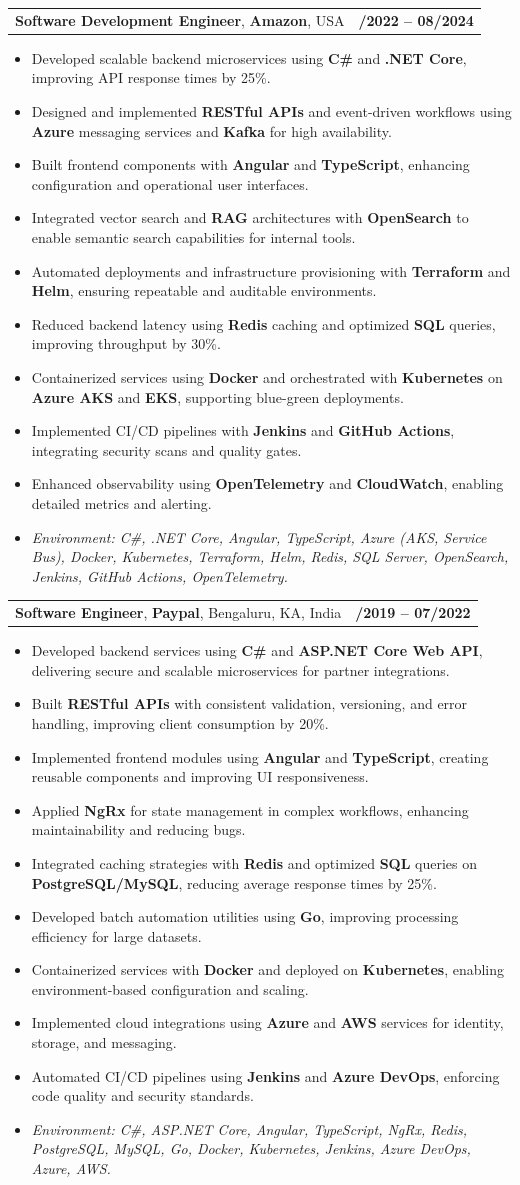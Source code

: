 \documentclass[letterpaper,11pt]{article}
\makeatletter
\newcommand{\resumeItem}[1]{
  \item\footnotesize{
    {#1 \vspace{-2pt}}
  }
}
\newcommand{\resumeSubheading}[4]{
  \vspace{-2pt}\item
    \begin{tabular*}{1.0\textwidth}[t]{l@{\extracolsep{\fill}}r}
      \textbf{\fontsize{10pt}{14pt}\selectfont #3}, \textbf{\fontsize{10pt}{14pt}\selectfont #1}, \fontsize{10pt}{14pt}\selectfont #4 & \textbf{\fontsize{10pt}{14pt}\selectfont #2} \\
    \end{tabular*}\vspace{-7pt}
}
\newcommand{\resumeItemListStart}{\begin{itemize}[leftmargin=*]}
\newcommand{\resumeItemListEnd}{\end{itemize}\vspace{-5pt}}
\makeatother
\begin{document}
\resumeSubheading
{Amazon}{10/2022 -- 08/2024}
{Software Development Engineer}{USA}
\resumeItemListStart
  \resumeItem{Developed scalable backend microservices using \textbf{C\#} and \textbf{.NET Core}, improving API response times by 25\%.}
  \resumeItem{Designed and implemented \textbf{RESTful APIs} and event-driven workflows using \textbf{Azure} messaging services and \textbf{Kafka} for high availability.}
  \resumeItem{Built frontend components with \textbf{Angular} and \textbf{TypeScript}, enhancing configuration and operational user interfaces.}
  \resumeItem{Integrated vector search and \textbf{RAG} architectures with \textbf{OpenSearch} to enable semantic search capabilities for internal tools.}
  \resumeItem{Automated deployments and infrastructure provisioning with \textbf{Terraform} and \textbf{Helm}, ensuring repeatable and auditable environments.}
  \resumeItem{Reduced backend latency using \textbf{Redis} caching and optimized \textbf{SQL} queries, improving throughput by 30\%.}
  \resumeItem{Containerized services using \textbf{Docker} and orchestrated with \textbf{Kubernetes} on \textbf{Azure AKS} and \textbf{EKS}, supporting blue-green deployments.}
  \resumeItem{Implemented CI/CD pipelines with \textbf{Jenkins} and \textbf{GitHub Actions}, integrating security scans and quality gates.}
  \resumeItem{Enhanced observability using \textbf{OpenTelemetry} and \textbf{CloudWatch}, enabling detailed metrics and alerting.}
  \resumeItem{\textit{Environment: C\#, .NET Core, Angular, TypeScript, Azure (AKS, Service Bus), Docker, Kubernetes, Terraform, Helm, Redis, SQL Server, OpenSearch, Jenkins, GitHub Actions, OpenTelemetry.}}
\resumeItemListEnd

\resumeSubheading
{Paypal}{08/2019 -- 07/2022}
{Software Engineer}{Bengaluru, KA, India}
\resumeItemListStart
  \resumeItem{Developed backend services using \textbf{C\#} and \textbf{ASP.NET Core Web API}, delivering secure and scalable microservices for partner integrations.}
  \resumeItem{Built \textbf{RESTful APIs} with consistent validation, versioning, and error handling, improving client consumption by 20\%.}
  \resumeItem{Implemented frontend modules using \textbf{Angular} and \textbf{TypeScript}, creating reusable components and improving UI responsiveness.}
  \resumeItem{Applied \textbf{NgRx} for state management in complex workflows, enhancing maintainability and reducing bugs.}
  \resumeItem{Integrated caching strategies with \textbf{Redis} and optimized \textbf{SQL} queries on \textbf{PostgreSQL/MySQL}, reducing average response times by 25\%.}
  \resumeItem{Developed batch automation utilities using \textbf{Go}, improving processing efficiency for large datasets.}
  \resumeItem{Containerized services with \textbf{Docker} and deployed on \textbf{Kubernetes}, enabling environment-based configuration and scaling.}
  \resumeItem{Implemented cloud integrations using \textbf{Azure} and \textbf{AWS} services for identity, storage, and messaging.}
  \resumeItem{Automated CI/CD pipelines using \textbf{Jenkins} and \textbf{Azure DevOps}, enforcing code quality and security standards.}
  \resumeItem{\textit{Environment: C\#, ASP.NET Core, Angular, TypeScript, NgRx, Redis, PostgreSQL, MySQL, Go, Docker, Kubernetes, Jenkins, Azure DevOps, Azure, AWS.}}
\resumeItemListEnd
\end{document}
